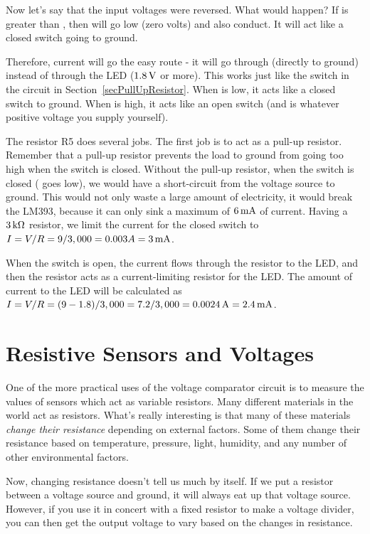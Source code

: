 Now let's say that the input voltages were reversed.
What would happen?
If  is greater than , then  will go low (zero volts) and also conduct.
It will act like a closed switch going to ground.

Therefore, current will go the easy route - it will go through  (directly to ground) instead of through the LED ($1.8\,\si{\volt}$ or more).
This works just like the switch in the circuit in Section~\ref{secPullUpResistor}.
When  is low, it acts like a closed switch to ground.
When  is high, it acts like an open switch (and is whatever positive voltage you supply yourself).

The resistor R5 does several jobs.
The first job is to act as a pull-up resistor. 
Remember that a pull-up resistor prevents the load to ground from going too high when the switch is closed.
Without the pull-up resistor, when the switch is closed ( goes low), we would have a short-circuit from the voltage source to ground.
This would not only waste a large amount of electricity, it would break the LM393, because it can only sink a maximum of $6\,\si{\milli\ampere}$ of current.
Having a $3\,\si{\kilo\ohm}$ resistor, we limit the current for the closed switch to $I = V / R = 9 / 3,000 = 0.003A = 3\,\si{\milli\ampere} $.

When the switch is open, the current flows through the resistor to the LED, and then the resistor acts as a current-limiting resistor for the LED.
The amount of current to the LED will be calculated as $I = V / R = (9 - 1.8) / 3,000 = 7.2 / 3,000 = 0.0024\,\si{\ampere} = 2.4\,\si{\milli\ampere}$.

\section{Resistive Sensors and Voltages}

One of the more practical uses of the voltage comparator circuit is to measure the values of sensors which act as variable resistors.
Many different materials in the world act as resistors.
What's really interesting is that many of these materials \emph{change their resistance} depending on external factors.
Some of them change their resistance based on temperature, pressure, light, humidity, and any number of other environmental factors.

Now, changing resistance doesn't tell us much by itself.
If we put a resistor between a voltage source and ground, it will always eat up that voltage source.
However, if you use it in concert with a fixed resistor to make a voltage divider, you can then get the output voltage to vary based on the changes in resistance.

